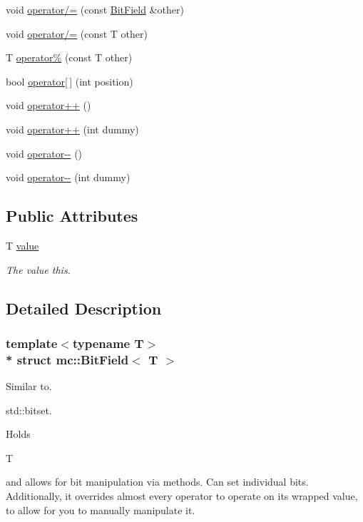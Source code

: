 \begin{DoxyCompactItemize}
\item 
void \hyperlink{structmc_1_1_bit_field_a376f642fb685b0b52eebcc879e89a48b}{operator/=} (const \hyperlink{structmc_1_1_bit_field}{Bit\+Field} \&other)
\item 
void \hyperlink{structmc_1_1_bit_field_ac3d40c0b58903af779eb6f87baf229e3}{operator/=} (const T other)
\item 
T \hyperlink{structmc_1_1_bit_field_a0a3a88acae62dec8cd021353de24c52a}{operator\%} (const T other)
\item 
bool \hyperlink{structmc_1_1_bit_field_ad5942474095b63182f1efda28385e9e7}{operator\mbox{[}$\,$\mbox{]}} (int position)
\item 
void \hyperlink{structmc_1_1_bit_field_a25e9f569bb29b4ffbfc76a3d14812a61}{operator++} ()
\item 
void \hyperlink{structmc_1_1_bit_field_a7d19ab9d46aba47b2c1ef87a5a61112e}{operator++} (int dummy)
\item 
void \hyperlink{structmc_1_1_bit_field_a797e997d7cffa3d4dcc82679eb7a4326}{operator-\/-\/} ()
\item 
void \hyperlink{structmc_1_1_bit_field_a82fafa3ed720f477b39f22bb841293f0}{operator-\/-\/} (int dummy)
\end{DoxyCompactItemize}
\subsection*{Public Attributes}
\begin{DoxyCompactItemize}
\item 
T \hyperlink{structmc_1_1_bit_field_ac4a96f98afd87fe71a7ad7c288e9e7d6}{value}
\begin{DoxyCompactList}\small\item\em The value this. \end{DoxyCompactList}\end{DoxyCompactItemize}


\subsection{Detailed Description}
\subsubsection*{template$<$typename T$>$\\*
struct mc\+::\+Bit\+Field$<$ T $>$}

Similar to. 


\begin{DoxyCode}
std::bitset. 
\end{DoxyCode}
 Holds
\begin{DoxyCode}
T 
\end{DoxyCode}
 and allows for bit manipulation via methods. Can set individual bits. Additionally, it overrides almost every operator to operate on it\textquotesingle{}s wrapped value, to allow for you to manually manipulate it. 


